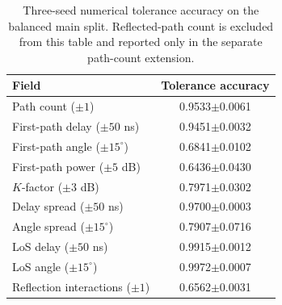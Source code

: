 \documentclass{article}
\begin{document}
\begin{table}[h]
\centering
\caption{Three-seed numerical tolerance accuracy on the balanced main split. Reflected-path count is excluded from this table and reported only in the separate path-count extension.}
\label{tab:fieldmetrics}
\begin{tabular}{lc}
\toprule
Field & Tolerance accuracy\\
\midrule
Path count ($\pm1$) & 0.9533$\pm$0.0061\\
First-path delay ($\pm50$ ns) & 0.9451$\pm$0.0032\\
First-path angle ($\pm15^\circ$) & 0.6841$\pm$0.0102\\
First-path power ($\pm5$ dB) & 0.6436$\pm$0.0430\\
$K$-factor ($\pm3$ dB) & 0.7971$\pm$0.0302\\
Delay spread ($\pm50$ ns) & 0.9700$\pm$0.0003\\
Angle spread ($\pm15^\circ$) & 0.7907$\pm$0.0716\\
LoS delay ($\pm50$ ns) & 0.9915$\pm$0.0012\\
LoS angle ($\pm15^\circ$) & 0.9972$\pm$0.0007\\
Reflection interactions ($\pm1$) & 0.6562$\pm$0.0031\\
\bottomrule
\end{tabular}
\end{table}
\end{document}

